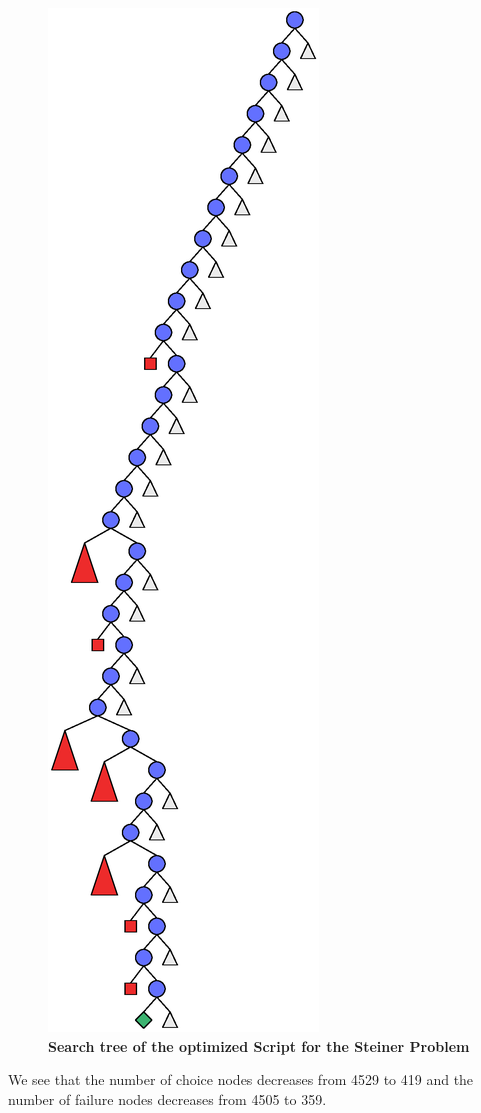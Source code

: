 \documentclass[a4paper,halfparskip]{scrartcl}
\begin{document}
\begin{figure}[htpb]
\centerline{\includegraphics*[scale=0.3]{figs/steiner2.eps}}
\caption{\textbf{Search tree of the optimized Script for the Steiner Problem}}
\label{figure 14}
\end{figure}
We see that the number of choice nodes decreases from 
4529 to 419 and the number of failure nodes decreases from 
4505 to 359.
\end{document}
